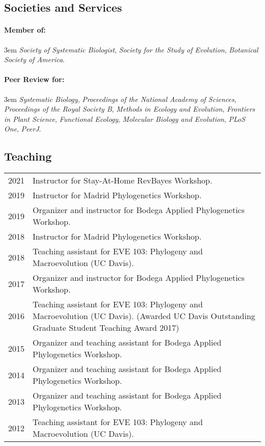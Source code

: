 \subsection*{Societies and Services}

\paragraph{Member of:}

\hangindent3em
\textit{Society of Systematic Biologist}, \textit{Society for the Study of Evolution}, \textit{Botanical Society of America}.

\paragraph{Peer Review for:}

\hangindent3em
\textit{Systematic Biology}, \textit{Proceedings of the National Academy of Sciences}, \textit{Proceedings of the Royal Society B}, \textit{Methods in Ecology and Evolution}, \textit{Frontiers in Plant Science}, \textit{Functional Ecology}, \textit{Molecular Biology and Evolution}, \textit{PLoS One}, \textit{PeerJ}.


\subsection*{Teaching}

\begin{tabularx}{\textwidth}{@{\hspace{1em}}lX}
    2021 & Instructor for Stay-At-Home RevBayes Workshop.\\
    2019 & Instructor for Madrid Phylogenetics Workshop.\\
    2019 & Organizer and instructor for Bodega Applied Phylogenetics Workshop.\\
    2018 & Instructor for Madrid Phylogenetics Workshop.\\
    2018 & Teaching assistant for EVE 103: Phylogeny and Macroevolution (UC Davis).\\
    2017 & Organizer and instructor for Bodega Applied Phylogenetics Workshop.\\
    2016 & Teaching assistant for EVE 103: Phylogeny and Macroevolution (UC Davis). (Awarded UC Davis Outstanding Graduate Student Teaching Award 2017)\\
    2015 & Organizer and teaching assistant for Bodega Applied Phylogenetics Workshop.\\
    2014 & Organizer and teaching assistant for Bodega Applied Phylogenetics Workshop.\\
    2013 & Organizer and teaching assistant for Bodega Applied Phylogenetics Workshop.\\
    2012 & Teaching assistant for EVE 103: Phylogeny and Macroevolution (UC Davis).
\end{tabularx}


